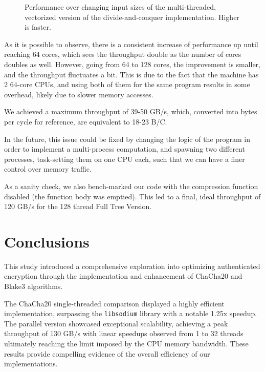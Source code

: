 \documentclass[letterpaper]{article}
\begin{document}
\begin{figure}[h]
\centering
	
	\caption{Performance over changing input sizes of the multi-threaded, vectorized version of the divide-and-conquer implementation. Higher is faster.
  \label{fig:fulltreeblake}}
  \vspace{-5pt}
\end{figure}

As it is possible to observe, there is a consistent increase of performance up until reaching 64 cores, which sees the throughput double as the number of cores doubles as well. However, going from 64 to 128 cores, the improvement is smaller, and the throughput fluctuates a bit. This is due to the fact that the machine has 2 64-core CPUs, and using both of them for the same program results in some overhead, likely due to slower memory accesses.

We achieved a maximum throughput of 39-50 GB/s, which, converted into bytes per cycle for reference, are equivalent to 18-23 B/C.

In the future, this issue could be fixed by changing the logic of the program in order to implement a multi-process computation, and spawning two different processes, task-setting them on one CPU each, such that we can have a finer control over memory traffic.

As a sanity check, we also bench-marked our code with the compression function disabled (the function body was emptied). This led to a final, ideal throughput of 120 GB/s for the 128 thread Full Tree Version.



\section{Conclusions}
This study introduced a comprehensive exploration into optimizing authenticated encryption through the implementation and enhancement of ChaCha20 and Blake3 algorithms.

The ChaCha20 single-threaded comparison displayed a highly efficient implementation, surpassing the \texttt{libsodium} library with a notable 1.25x speedup. The parallel version showcased exceptional scalability, achieving a peak throughput of 130 GB/s with linear speedups observed from 1 to 32 threads ultimately reaching the limit imposed by the CPU memory bandwidth. These results provide compelling evidence of the overall efficiency of our implementations.
\end{document}
